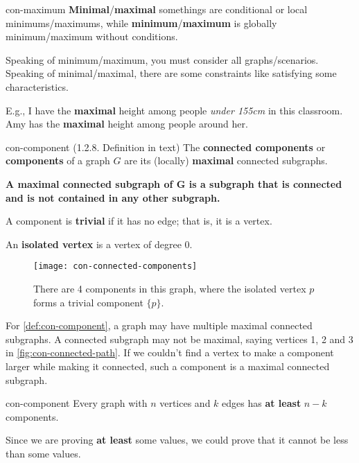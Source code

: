 \documentclass[../src/handouts/main.tex]{subfiles}
\begin{document}
\begin{remark}{}{con-maximum}
  \textbf{Minimal}/\textbf{maximal} somethings are conditional or local minimums/maximums, while \textbf{minimum}/\textbf{maximum} is globally minimum/maximum without conditions.

  Speaking of minimum/maximum, you must consider all graphs/scenarios. Speaking of minimal/maximal, there are some constraints like satisfying some characteristics.

  E.g., I have the \textbf{maximal} height among people \textit{under 155cm} in this classroom. Amy has the \textbf{maximal} height among people around her.
\end{remark}

\begin{definition}{}{con-component}
  (1.2.8. Definition in text)
  The \textbf{connected components} or \textbf{components} of a graph $G$ are its (locally) \textbf{maximal} connected subgraphs.

  \textbf{A maximal connected subgraph of $\bm{G}$ is a subgraph that is connected and is not contained in any other subgraph.}

  A component is \textbf{trivial} if it has no edge; that is, it is a vertex.

  An \textbf{isolated vertex} is a vertex of degree 0.
\end{definition}

\begin{figure}[htbp]
  \centering
  \texttt{[image: con-connected-components]}
  \caption{There are 4 components in this graph, where the isolated vertex $p$ forms a trivial component $\{p\}$.}
  \label{fig:con-component}
\end{figure}

For \cref{def:con-component}, a graph may have multiple maximal connected subgraphs. A connected subgraph may not be maximal, saying vertices 1, 2 and 3 in \cref{fig:con-connected-path}. If we couldn't find a vertex to make a component larger while making it connected, such a component is a maximal connected subgraph.

\begin{proposition}{}{con-component}
  Every graph with $n$ vertices and $k$ edges has \textbf{at least} $n - k$ components.
\end{proposition}

Since we are proving \textbf{at least} some values, we could prove that it cannot be less than some values. 
\end{document}
